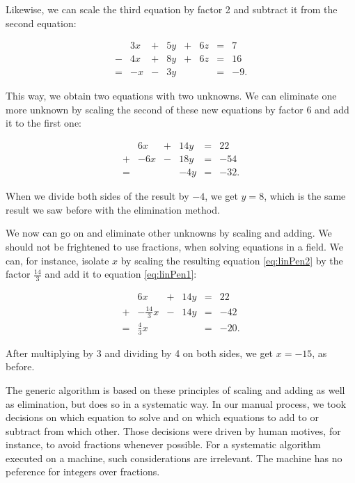 \documentclass[tikz]{scrreprt}
\begin{document}
Likewise, we can scale the third equation by factor 2
and subtract it from the second equation:

\begin{equation}\label{eq:linPen2}
\begin{array}{crcrcrcr}
  & 3x & + & 5y  & + & 6z & = &  7\\
- & 4x & + & 8y  & + & 6z & = & 16\\
= & -x & - & 3y  &   &    & = & -9.
\end{array}
\end{equation}

This way, we obtain two equations with two unknowns.
We can eliminate one more unknown by scaling the second
of these new equations by factor 6 and add it to the
first one:

\begin{equation}
\begin{array}{crcrcr}
  &  6x & + & 14y  & = &  22\\
+ & -6x & - & 18y  & = & -54\\
= &     &   & -4y  & = & -32.
\end{array}
\end{equation}

When we divide both sides of the result by $-4$,
we get $y = 8$, which is the same result we saw
before with the elimination method.

We now can go on and eliminate other unknowns
by scaling and adding. We should not be frightened
to use fractions, when solving equations in a field.
We can, for instance, isolate $x$ by scaling
the resulting equation \ref{eq:linPen2} by the factor
$\frac{14}{3}$ and add it to equation \ref{eq:linPen1}:

\begin{equation}
\begin{array}{crcrcr}
  &             6x & + & 14y  & = &  22\\
+ & -\frac{14}{3}x & - & 14y  & = & -42\\
= &  \frac{4}{3}x  &   &      & = & -20.
\end{array}
\end{equation}

After multiplying by $3$ and dividing by 4 on both sides,
we get $x = -15$, as before.

The generic algorithm is based on
these principles of scaling and adding as well as elimination,
but does so in a systematic way. In our manual process,
we took decisions on which equation to solve and on which
equations to add to or subtract from which other. 
Those decisions 
were driven by human motives, for instance, to avoid
fractions whenever possible. For a systematic algorithm
executed on a machine, such considerations are irrelevant.
The machine has no peference for integers over fractions.
\end{document}
